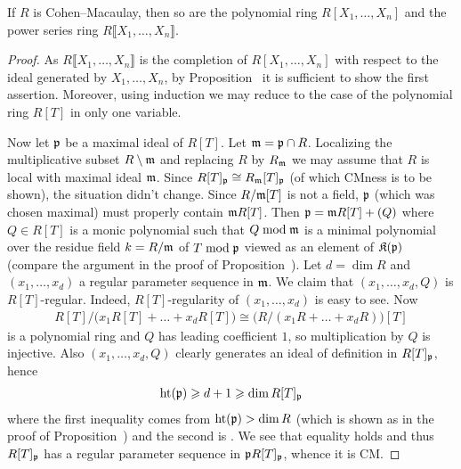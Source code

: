 \documentclass[a4paper,parskip=half,numbers=enddot, DIV=12]{scrreprt}
\renewcommand{\geq}{\geqslant}
\renewcommand{\leq}{\leqslant}
\begin{document}
\begin{prop}
	If $R$ is Cohen--Macaulay, then so are the polynomial ring $R[X_1,\ldots,X_n]$ and the power series ring $R\llbracket X_1,\ldots,X_n\rrbracket$.
\end{prop}
\begin{proof}
	As $R\llbracket X_1,\ldots,X_n\rrbracket$ is the completion of $R[X_1,\ldots,X_n]$ with respect to the ideal generated by $X_1,\ldots,X_n$, by Proposition~ it is sufficient to show the first assertion. Moreover, using induction we may reduce to the case of the polynomial ring $R[T]$ in only one variable. 
	
	Now let $\mathfrak{p}$ be a maximal ideal of $R[T]$. Let $\mathfrak{m}=\mathfrak{p}\cap R$. Localizing the multiplicative subset $R\setminus \mathfrak{m}$ and replacing $R$ by $R_{\mathfrak{m}}$ we may assume that $R$ is local with maximal ideal $\mathfrak{m}$. Since $R[T]_{\mathfrak{p}}\cong R_{\mathfrak{m}}[T]_{\mathfrak{p}}$ (of which CMness is to be shown), the situation didn't change. Since $R/\mathfrak{m}[T]$ is not a field, $\mathfrak{p}$ (which was chosen maximal) must properly contain $\mathfrak{m} R[T]$. Then $\mathfrak{p}=\mathfrak{m} R[T]+(Q)$ where $Q\in R[T]$ is a monic polynomial such that $Q\bmod \mathfrak{m}$ is a minimal polynomial over the residue field $k=R/\mathfrak{m}$ of $T\bmod \mathfrak{p}$ viewed as an element of $\mathfrak{K}(\mathfrak{p})$ (compare the argument in the proof of Proposition~). Let $d=\dim R$ and $(x_1,\ldots,x_d)$ a regular parameter sequence in $\mathfrak{m}$. We claim that $(x_1,\ldots,x_d,Q)$ is $R[T]$-regular. Indeed, $R[T]$-regularity of $(x_1,\ldots,x_d)$ is easy to see. Now
	\begin{align*}
		R[T]/\big(x_1R[T]+\ldots+x_dR[T]\big)\cong\big(R/(x_1R+\ldots+x_dR)\big)[T]
	\end{align*}
	is a polynomial ring and $Q$ has leading coefficient $1$, so multiplication by $Q$ is injective. Also $(x_1,\ldots,x_d,Q)$ clearly generates an ideal of definition in $R[T]_{\mathfrak{p}}$, hence
	\begin{align*}
		\hoehe(\pp)\geq d+1\geq \dim R[T]_\pp
	\end{align*}
	where the first inequality comes from $\operatorname{ht}(\mathfrak{p})> \dim R$ (which is shown as in the proof of Proposition~) and the second is \cite[Theorem~12]{alg2}. We see that equality holds and thus $R[T]_{\mathfrak{p}}$ has a regular parameter sequence in $\mathfrak{p} R[T]_{\mathfrak{p}}$, whence it is CM.
\end{proof}
\end{document}
